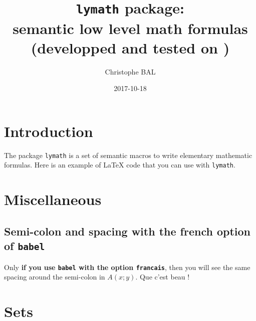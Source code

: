 \documentclass[12pt,a4paper]{article}
\theoremstyle{definition}
\begin{document}
\title{\texttt{lymath} package:\\semantic low level math formulas\\{\footnotesize (developped and tested on \macosxname{})}}
\author{Christophe BAL}
\date{2017-10-18}

\maketitle


\section{Introduction}



The package \verb+lymath+ is a set of semantic macros to write elementary mathematic formulas. Here is an example of \LaTeX{} code that you can use with \verb+lymath+.

\begin{tcblisting}{listing only}

Knowing that $\frac{df}{dx} = 4 cos(x^2)$, we have: 
$\int_a^b cos(x^2) dx = \left[ \frac{1){4} f(x) \right]_a^b$.


Knowing that $\derfrac{f}{x} = 4 cos(x^2)$, we have: 
$\int_a^b cos(x^2) dx = \hook{\frac{1){4} f(x)}{a}{b}$.
\end{tcblisting}


\section{Miscellaneous}



\subsection{Semi-colon and spacing with the french option of \texttt{babel}}

\begin{tcblisting}{}
Only \textbf{if you use \texttt{babel} with the option \texttt{francais}}, then
you will see the same spacing around the semi-colon in $A(x;y)$. Que c'est beau !
\end{tcblisting}


\section{Sets}
\end{document}
